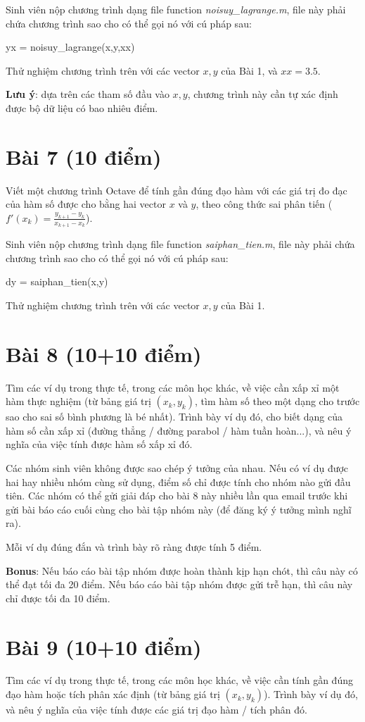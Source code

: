 \documentclass[12pt]{article}
\begin{document}
Sinh viên nộp chương trình dạng file function \emph{noisuy\_lagrange.m}, file này phải chứa chương trình sao cho có thể gọi nó với cú pháp sau:

yx = noisuy\_lagrange(x,y,xx)

Thử nghiệm chương trình trên với các vector $x, y$ của Bài 1, và $xx=3.5$.

\textbf{Lưu ý}: dựa trên các tham số đầu vào $x, y$, chương trình này cần tự xác định được bộ dữ liệu có bao nhiêu điểm.

\section{Bài 7 (10 điểm)}
Viết một chương trình Octave để tính gần đúng đạo hàm với các giá trị đo đạc của hàm số được cho bằng hai vector $x$ và $y$, theo công thức sai phân tiến ($f'(x_k)=\frac{y_{k+1}-y_k}{x_{k+1}-x_k}$).

Sinh viên nộp chương trình dạng file function \emph{saiphan\_tien.m}, file này phải chứa chương trình sao cho có thể gọi nó với cú pháp sau:

dy = saiphan\_tien(x,y)

Thử nghiệm chương trình trên với các vector $x, y$ của Bài 1.

\section{Bài 8 (10+10 điểm)}
Tìm các ví dụ trong thực tế, trong các môn học khác, về việc cần xấp xỉ một hàm thực nghiệm (từ bảng giá trị $(x_k,y_k)$, tìm hàm số theo một dạng cho trước sao cho sai số bình phương là bé nhất). Trình bày ví dụ đó, cho biết dạng của hàm số cần xấp xỉ (đường thẳng / đường parabol / hàm tuần hoàn...), và nêu ý nghĩa của việc tính được hàm số xấp xỉ đó.

Các nhóm sinh viên không được sao chép ý tưởng của nhau. Nếu có ví dụ được hai hay nhiều nhóm cùng sử dụng, điểm số chỉ được tính cho nhóm nào gửi đầu tiên. Các nhóm có thể gửi giải đáp cho bài 8 này nhiều lần qua email trước khi gửi bài báo cáo cuối cùng cho bài tập nhóm này (để đăng ký ý tưởng mình nghĩ ra).

Mỗi ví dụ đúng đắn và trình bày rõ ràng được tính 5 điểm.

\textbf{Bonus}: Nếu báo cáo bài tập nhóm được hoàn thành kịp hạn chót, thì câu này có thể đạt tối đa 20 điểm. Nếu báo cáo bài tập nhóm được gửi trễ hạn, thì câu này chỉ được tối đa 10 điểm.

\section{Bài 9 (10+10 điểm)}
Tìm các ví dụ trong thực tế, trong các môn học khác, về việc cần tính gần đúng đạo hàm hoặc tích phân xác định (từ bảng giá trị $(x_k,y_k)$). Trình bày ví dụ đó, và nêu ý nghĩa của việc tính được các giá trị đạo hàm / tích phân đó.
\end{document}
